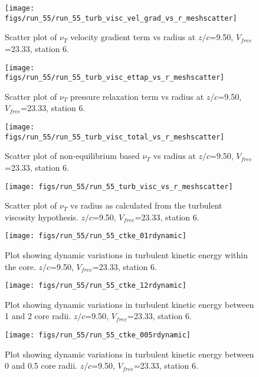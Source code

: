\begin{figure}[H]
\centering
\texttt{[image: figs/run\_55/run\_55\_turb\_visc\_vel\_grad\_vs\_r\_meshscatter]}
\caption{Scatter plot of $\nu_T$ velocity gradient term vs radius at $z/c$=9.50, $V_{free}$=23.33, station 6.}
\end{figure}


\begin{figure}[H]
\centering
\texttt{[image: figs/run\_55/run\_55\_turb\_visc\_ettap\_vs\_r\_meshscatter]}
\caption{Scatter plot of $\nu_T$ pressure relaxation term vs radius at $z/c$=9.50, $V_{free}$=23.33, station 6.}
\end{figure}


\begin{figure}[H]
\centering
\texttt{[image: figs/run\_55/run\_55\_turb\_visc\_total\_vs\_r\_meshscatter]}
\caption{Scatter plot of non-equilibrium based $\nu_T$ vs radius at $z/c$=9.50, $V_{free}$=23.33, station 6.}
\end{figure}


\begin{figure}[H]
\centering
\texttt{[image: figs/run\_55/run\_55\_turb\_visc\_vs\_r\_meshscatter]}
\caption{Scatter plot of $\nu_T$ vs radius as calculated from the turbulent viscosity hypothesis. $z/c$=9.50, $V_{free}$=23.33, station 6.}
\end{figure}


\begin{figure}[H]
\centering
\texttt{[image: figs/run\_55/run\_55\_ctke\_01rdynamic]}
\caption{Plot showing dynamic variations in turbulent kinetic energy within the core. $z/c$=9.50, $V_{free}$=23.33, station 6.}
\end{figure}


\begin{figure}[H]
\centering
\texttt{[image: figs/run\_55/run\_55\_ctke\_12rdynamic]}
\caption{Plot showing dynamic variations in turbulent kinetic energy between 1 and 2 core radii. $z/c$=9.50, $V_{free}$=23.33, station 6.}
\end{figure}


\begin{figure}[H]
\centering
\texttt{[image: figs/run\_55/run\_55\_ctke\_005rdynamic]}
\caption{Plot showing dynamic variations in turbulent kinetic energy between 0 and 0.5 core radii. $z/c$=9.50, $V_{free}$=23.33, station 6.}
\end{figure}


